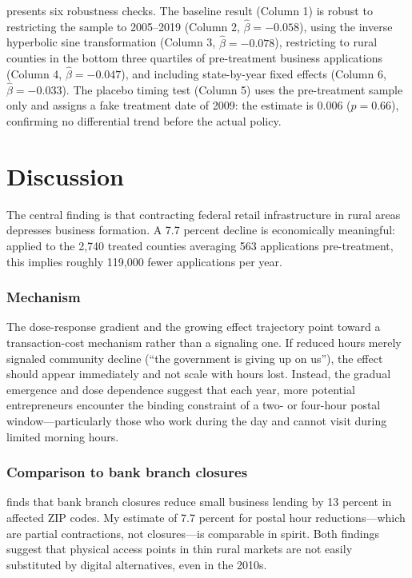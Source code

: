 \documentclass[12pt]{article}
\begin{document}


 presents six robustness checks. The baseline result (Column 1) is robust to restricting the sample to 2005--2019 (Column 2, $\hat{\beta} = -0.058$), using the inverse hyperbolic sine transformation (Column 3, $\hat{\beta} = -0.078$), restricting to rural counties in the bottom three quartiles of pre-treatment business applications (Column 4, $\hat{\beta} = -0.047$), and including state-by-year fixed effects (Column 6, $\hat{\beta} = -0.033$). The placebo timing test (Column 5) uses the pre-treatment sample only and assigns a fake treatment date of 2009: the estimate is 0.006 ($p = 0.66$), confirming no differential trend before the actual policy.

\section{Discussion}

The central finding is that contracting federal retail infrastructure in rural areas depresses business formation. A 7.7 percent decline is economically meaningful: applied to the 2,740 treated counties averaging 563 applications pre-treatment, this implies roughly 119,000 fewer applications per year.

\subsubsection*{Mechanism} The dose-response gradient and the growing effect trajectory point toward a transaction-cost mechanism rather than a signaling one. If reduced hours merely signaled community decline (``the government is giving up on us''), the effect should appear immediately and not scale with hours lost. Instead, the gradual emergence and dose dependence suggest that each year, more potential entrepreneurs encounter the binding constraint of a two- or four-hour postal window---particularly those who work during the day and cannot visit during limited morning hours.

\subsubsection*{Comparison to bank branch closures} \citet{nguyen2019bank} finds that bank branch closures reduce small business lending by 13 percent in affected ZIP codes. My estimate of 7.7 percent for postal hour reductions---which are partial contractions, not closures---is comparable in spirit. Both findings suggest that physical access points in thin rural markets are not easily substituted by digital alternatives, even in the 2010s.
\end{document}
